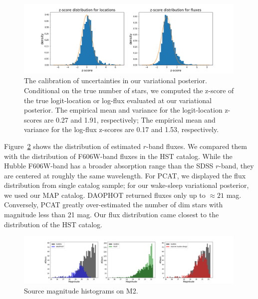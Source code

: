 \begin{figure}[ht]
    \centering
    \includegraphics[width=0.99\textwidth]{figures/z-score_calibration.png}
    \caption{The calibration of uncertainties in our variational posterior. Conditional on the true number of stars, we computed the z-score of the true logit-location or log-flux evaluated at our variational posterior. 
    The empirical mean and variance for the logit-location z-scores are 0.27 and 1.91, respectively; The empirical mean and variance for the log-flux z-scores are 0.17 and 1.53, respectively. 
}
    \label{fig:z-score_calibration}
\end{figure}

Figure~\ref{fig:luminosity_fun_m2} shows the distribution of estimated $r$-band fluxes. We compared them 
with the distribution of F606W-band fluxes in the HST catalog. While the Hubble F606W-band has a broader absorption range than the SDSS $r$-band, they are centered at roughly the same wavelength. For PCAT, we displayed the flux distribution from single catalog sample; for our wake-sleep variational 
posterior, we used our MAP catalog. DAOPHOT returned fluxes only up to $\approx21$ mag.
Conversely, PCAT greatly over-estimated the number of dim stars with magnitude less than 21 mag. Our flux distribution came closest to the distribution of the HST catalog. 

\begin{figure}[ht]
    \centering
    \includegraphics[width=0.99\textwidth]{figures/luminosity_fun.png}
    \caption{Source magnitude histograms on M2. }
    \label{fig:luminosity_fun_m2}
\end{figure}

